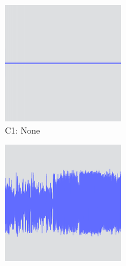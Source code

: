 \begin{figure}[p]
  \centering
  \begin{subfigure}{.3\textwidth}
    \centering
    \includegraphics[width=\columnwidth]{figs/condition1.png}
    \caption{C1: None}
  \end{subfigure}
  \begin{subfigure}{.3\textwidth}
    \centering
    \includegraphics[width=\columnwidth]{figs/condition2.png}

\end{subfigure}
\end{figure}
